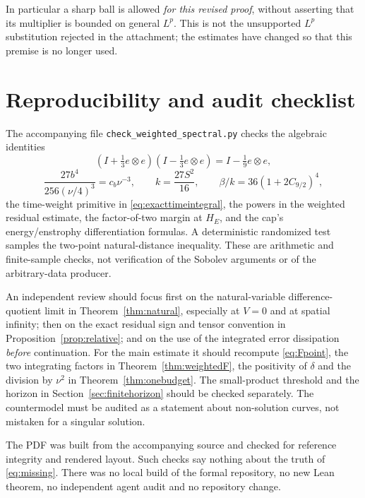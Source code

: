 \documentclass[11pt,a4paper]{article}
\theoremstyle{definition}\newtheorem{definition}[theorem]{Definition}
\theoremstyle{remark}\newtheorem{remark}[theorem]{Remark}
\numberwithin{equation}{section}
\begin{document}
In particular a sharp ball is allowed \emph{for this revised proof}, without asserting that its multiplier is bounded on general $L^p$. This is not the unsupported $L^p$ substitution rejected in the attachment; the estimates have changed so that this premise is no longer used.

\section{Reproducibility and audit checklist}
\label{app:checks}
The accompanying file \texttt{check\_weighted\_spectral.py} checks the algebraic identities
\[
 (I+\tfrac13 e\otimes e)(I-\tfrac13e\otimes e)=I-\tfrac19e\otimes e,
\]
\[
 \frac{27b^4}{256(\nu/4)^3}=c_b\nu^{-3},\qquad
 k=\frac{27S^2}{16},\qquad \beta/k=36(1+2C_{9/2})^4,
\]
the time-weight primitive in \eqref{eq:exacttimeintegral}, the powers in the weighted residual estimate, the factor-of-two margin at $H_E$, and the cap's energy/enstrophy differentiation formulas. A deterministic randomized test samples the two-point natural-distance inequality. These are arithmetic and finite-sample checks, not verification of the Sobolev arguments or of the arbitrary-data producer.

An independent review should focus first on the natural-variable difference-quotient limit in Theorem~\ref{thm:natural}, especially at $V=0$ and at spatial infinity; then on the exact residual sign and tensor convention in Proposition~\ref{prop:relative}; and on the use of the integrated error dissipation \emph{before} continuation. For the main estimate it should recompute \eqref{eq:Fpoint}, the two integrating factors in Theorem~\ref{thm:weightedF}, the positivity of $\delta$ and the division by $\nu^2$ in Theorem~\ref{thm:onebudget}. The small-product threshold and the horizon in Section~\ref{sec:finitehorizon} should be checked separately. The countermodel must be audited as a statement about non-solution curves, not mistaken for a singular solution.

The PDF was built from the accompanying source and checked for reference integrity and rendered layout. Such checks say nothing about the truth of \eqref{eq:missing}. There was no local build of the formal repository, no new Lean theorem, no independent agent audit and no repository change.
\end{document}

